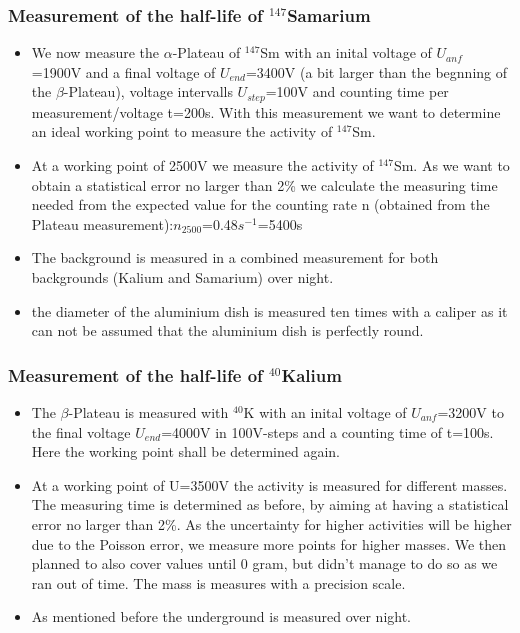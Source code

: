 \documentclass[12pt]{article}
\begin{document}
\subsubsection{Measurement of the half-life of ${}^{147}$Samarium}

\begin{itemize}
	
	\item We now measure the $\alpha$-Plateau of ${}^{147}$Sm with an inital voltage of $U_{anf}$=1900V and a final voltage of $U_{end}$=3400V (a bit larger than the begnning of the $\beta$-Plateau), voltage intervalls $U_{step}$=100V and counting time per measurement/voltage t=200s. With this measurement we want to determine an ideal working point to measure the activity of ${}^{147}$Sm.
	
	\item At a working point of 2500V we measure the activity of ${}^{147}$Sm.
      As we want to obtain a statistical error no larger than 2\% we calculate the measuring time needed from the expected value for the counting rate n (obtained from the Plateau measurement):$n_{2500}$=0.48$s^{-1}$=5400s
      
    \item The background is measured in a combined measurement for both backgrounds (Kalium and Samarium) over night.
    
    \item the diameter of the aluminium dish is measured ten times with a caliper as it can not be assumed that the aluminium dish is perfectly round. 

\end{itemize}

\subsubsection{Measurement of the half-life of ${}^{40}$Kalium}
\label{kaliumdurchfuehrung}

\begin{itemize}
	\item The $\beta$-Plateau is measured with ${}^{40}$K with an inital voltage of $U_{anf}$=3200V to the final voltage $U_{end}$=4000V in 100V-steps and a counting time of t=100s. Here the working point shall be determined again.
	
	\item At a working point of U=3500V  the activity is measured for different masses. The measuring time is determined as before, by aiming at having a statistical error no larger than 2\%. As the uncertainty for higher activities will be higher due to the Poisson error, we measure more points for higher masses. We then planned to also cover values until 0 gram, but didn't manage to do so as we ran out of time. The mass is measures with a precision scale.
	
	\item As mentioned before the underground is measured over night.
	
\end{itemize}
\end{document}
